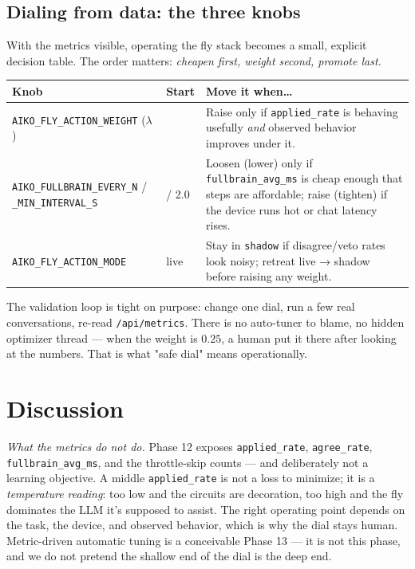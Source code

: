 \documentclass[11pt]{article}
\begin{document}
\subsection{Dialing from data: the three knobs}

With the metrics visible, operating the fly stack becomes a small, explicit decision table. The order matters: \emph{cheapen first, weight second, promote last.}

{\small
{}
\begin{longtable}{@{}>{\raggedright\arraybackslash}p{} >{\raggedright\arraybackslash}p{} >{\raggedright\arraybackslash}p{}@{}}
\toprule
\textbf{Knob} & \textbf{Start} & \textbf{Move it when…} \\
\midrule
\texttt{AIKO\_FLY\_ACTION\_WEIGHT} (\(\lambda\)) & 0.25 & Raise only if \texttt{applied\_rate} is behaving usefully \emph{and} observed behavior improves under it. \\
\texttt{AIKO\_FULLBRAIN\_EVERY\_N} / \texttt{\_MIN\_INTERVAL\_S} & 3 / 2.0 & Loosen (lower) only if \texttt{fullbrain\_avg\_ms} is cheap enough that steps are affordable; raise (tighten) if the device runs hot or chat latency rises. \\
\texttt{AIKO\_FLY\_ACTION\_MODE} & live & Stay in \texttt{shadow} if disagree/veto rates look noisy; retreat live → shadow before raising any weight. \\
\bottomrule
\end{longtable}
}

The validation loop is tight on purpose: change one dial, run a few real conversations, re-read \texttt{/api/metrics}. There is no auto-tuner to blame, no hidden optimizer thread — when the weight is \(0.25\), a human put it there after looking at the numbers. That is what "safe dial" means operationally.

\section{Discussion}

\emph{What the metrics do not do.} Phase 12 exposes \texttt{applied\_rate}, \texttt{agree\_rate}, \texttt{fullbrain\_avg\_ms}, and the throttle-skip counts — and deliberately not a learning objective. A middle \texttt{applied\_rate} is not a loss to minimize; it is a \emph{temperature reading}: too low and the circuits are decoration, too high and the fly dominates the LLM it's supposed to assist. The right operating point depends on the task, the device, and observed behavior, which is why the dial stays human. Metric-driven automatic tuning is a conceivable Phase 13 — it is not this phase, and we do not pretend the shallow end of the dial is the deep end.
\end{document}
